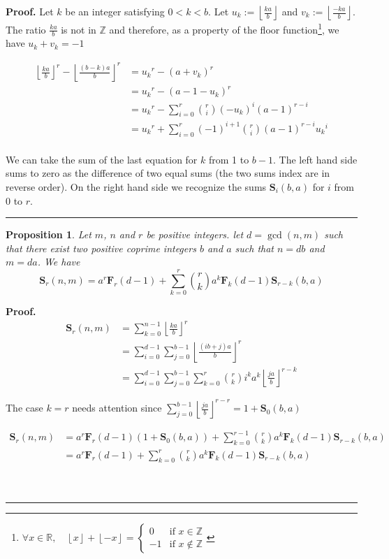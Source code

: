 \documentclass{article}%
\newtheorem{proposition}[theorem]{Proposition}
\newenvironment{proof}[1][Proof]{\textbf{#1.} }{\ \rule{0.5em}{0.5em}}
\newcommand{\ENT}[1]{ \left\lfloor #1 \right\rfloor}
\newcommand{\SUMS}[3]{\mathbf{S}_{#1}\left(#2,#3\right)}
\newcommand{\SUMF}[2]{\mathbf{F}_{#1}\left(#2\right)}
\begin{document}
\begin{proof}
Let $k$ be an integer satisfying $0<k<b$. Let $u_k:=\ENT{\frac{ka}{b}}$ and $v_k:=\ENT{\frac{-ka}{b}}$. The ratio $\frac{ka}{b}$ is not in $\mathbb{Z}$ and therefore, as a property of the floor function\footnote{$\forall x \in \mathbb{R}, \quad \left\lfloor x\right\rfloor + \left\lfloor -x \right\rfloor = 
\left\{
    \begin{array}{ll}
				0  & \mbox{if  } x\in\mathbb{Z} \\
        -1 & \mbox{if  } x\notin\mathbb{Z}
    \end{array}
\right.$}, we have $u_k+v_k=-1$

\begin{align*}
\ENT{\frac{ka}{b}}^r-\ENT{\frac{(b-k)a}{b}}^r
&= {u_k}^r-(a+v_k)^r \\
&= {u_k}^r-(a-1-u_k)^r \\
&= {u_k}^r-\sum_{i=0}^r\binom{r}{i}(-u_k)^i(a-1)^{r-i} \\
&= {u_k}^r+\sum_{i=0}^r(-1)^{i+1}\binom{r}{i}(a-1)^{r-i}{u_k}^i \\
\end{align*}

We can take the sum of the last equation for $k$ from 1 to $b-1$. The left hand side sums to zero as the difference of two equal sums (the two sums index are in reverse order). On the right hand side we recognize the sums $\SUMS{i}{b}{a}$ for $i$ from 0 to $r$.
\end{proof}

\begin{proposition}\label{prop:rel_Srnm_Siba} Let $m$, $n$ and $r$ be positive integers. let $d=\gcd(n,m)$ such that there exist two positive coprime integers $b$ and $a$ such that $n=db$ and $m=da$. We have
\begin{equation}
\SUMS{r}{n}{m} = a^r\SUMF{r}{d-1}+\sum_{k=0}^{r}\binom{r}{k}a^k\SUMF{k}{d-1}\SUMS{r-k}{b}{a}
\label{eq:rel_Srnm_Siba}
\end{equation}
\end{proposition}

\begin{proof}
\begin{align*}
\SUMS{r}{n}{m}
&= \sum_{k=0}^{n-1}\ENT{\frac{ka}{b}}^r \\
&= \sum_{i=0}^{d-1}\sum_{j=0}^{b-1}\ENT{\frac{(ib+j)a}{b}}^r \\
&= \sum_{i=0}^{d-1}\sum_{j=0}^{b-1}\sum_{k=0}^r\binom{r}{k}i^ka^k\ENT{\frac{ja}{b}}^{r-k} 
\end{align*}
 
The case $k=r$ needs attention since $\sum_{j=0}^{b-1}\ENT{\frac{ja}{b}}^{r-r}=1+\SUMS{0}{b}{a}$

\begin{align*}
\SUMS{r}{n}{m} 
&= a^r\SUMF{r}{d-1}(1+\SUMS{0}{b}{a})+\sum_{k=0}^{r-1}\binom{r}{k}a^k\SUMF{k}{d-1}\SUMS{r-k}{b}{a} \\
&= a^r\SUMF{r}{d-1}+\sum_{k=0}^{r}\binom{r}{k}a^k\SUMF{k}{d-1}\SUMS{r-k}{b}{a} \\
\end{align*}

\end{proof}
\end{document}
